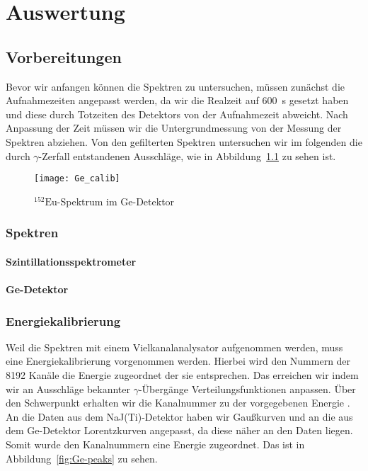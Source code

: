 \documentclass[11pt, ngerman, fleqn, DIV=15, headinclude, BCOR=2cm]{scrreprt}
\newcommand{\plotwidth}{0.8\linewidth}
\begin{document}
\chapter{Auswertung}

\section{Vorbereitungen}

Bevor wir anfangen können die Spektren zu untersuchen, müssen zunächst die
Aufnahmezeiten angepasst werden, da wir die Realzeit auf \SI{600}{\second} gesetzt
haben und diese durch Totzeiten des Detektors von der Aufnahmezeit abweicht.
Nach Anpassung der Zeit müssen wir die Untergrundmessung von der Messung der Spektren 
abziehen. Von den gefilterten Spektren untersuchen wir im folgenden die durch
$\gamma$-Zerfall entstandenen Ausschläge, wie in
Abbildung~\ref{fig:energiekalibrierung} zu sehen ist.

\begin{figure}[h]
    \centering
    \texttt{[image: Ge\_calib]}
    \caption{%
	    $^{152}\text{Eu}$-Spektrum im Ge-Detektor
    }
    \label{fig:energiekalibrierung}
\end{figure}

\subsection{Spektren}
\subsubsection{Szintillationsspektrometer}


\subsubsection{Ge-Detektor}



\subsection{Energiekalibrierung}

Weil die Spektren mit einem Vielkanalanalysator aufgenommen werden, muss eine
Energiekalibrierung vorgenommen werden. Hierbei wird den Nummern der 8192
Kanäle die Energie zugeordnet der sie entsprechen.
Das erreichen wir indem wir an Ausschläge bekannter $\gamma$-Übergänge
Verteilungsfunktionen anpassen. Über den Schwerpunkt erhalten wir die Kanalnummer zu 
der vorgegebenen Energie . 
An die Daten aus dem NaJ(Ti)-Detektor haben wir Gaußkurven und an die
aus dem Ge-Detektor Lorentzkurven angepasst, da diese näher an den Daten liegen.
Somit wurde den Kanalnummern eine Energie zugeordnet. Das ist in
Abbildung~\ref{fig:Ge-peaks} zu sehen.
\end{document}
